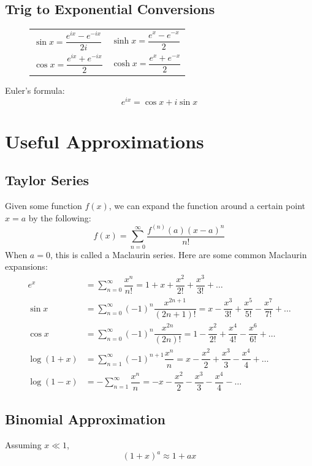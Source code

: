 \documentclass[oneside]{book}
\numberwithin{figure}{section}
\numberwithin{equation}{section}
\theoremstyle{definition}
\begin{document}
	\section{Trig to Exponential Conversions}
	\begin{figure}[H]
		\centering
		\begin{tabularx}{\columnwidth}{Y Y}
			$ \sin x = \dfrac{e^{ix} - e^{-ix}}{2i} $ & $ \sinh x = \dfrac{e^x - e^{-x}}{2} $\\[1em]
			$ \cos x = \dfrac{e^{ix} + e^{-ix}}{2} $ & $ \cosh x = \dfrac{e^x + e^{-x}}{2} $
		\end{tabularx}
	\end{figure}
	Euler's formula:
	\begin{equation}
		e^{ix} = \cos x + i\sin x
	\end{equation}

	\chapter{Useful Approximations}
	\section{Taylor Series}
	Given some function $ f(x) $, we can expand the function around a certain point $ x = a $ by the following:
	\begin{equation}
		f(x) = \sum_{n = 0}^{\infty}\dfrac{f^{(n)}(a)(x - a)^n}{n!}
	\end{equation}
	When $ a = 0 $, this is called a Maclaurin series. Here are some common Maclaurin expansions:
	\begin{align}
		e^x &= \sum_{n = 0}^{\infty}\dfrac{x^n}{n!} = 1 + x + \dfrac{x^2}{2!} + \dfrac{x^3}{3!} + \ldots\\
		\sin x &= \sum_{n = 0}^{\infty}(-1)^n\dfrac{x^{2n + 1}}{(2n + 1)!} = x - \dfrac{x^3}{3!} + \dfrac{x^5}{5!} - \dfrac{x^7}{7!} + \ldots\\
		\cos x &= \sum_{n = 0}^{\infty}(-1)^n\dfrac{x^{2n}}{(2n)!} = 1 - \dfrac{x^2}{2!} + \dfrac{x^4}{4!} - \dfrac{x^6}{6!} + \ldots\\
		\log(1 + x) &= \sum_{n = 1}^{\infty}(-1)^{n + 1}\dfrac{x^n}{n} = x - \dfrac{x^2}{2} + \dfrac{x^3}{3} - \dfrac{x^4}{4} + \ldots\\
		\log(1 - x) &= -\sum_{n = 1}^{\infty}\dfrac{x^n}{n} = -x - \dfrac{x^2}{2} - \dfrac{x^3}{3} - \dfrac{x^4}{4} - \ldots
	\end{align}
	
	\section{Binomial Approximation}
	Assuming $ x \ll 1 $,
	\begin{equation}
		(1 + x)^a \approx 1 + ax
	\end{equation}
\end{document}
